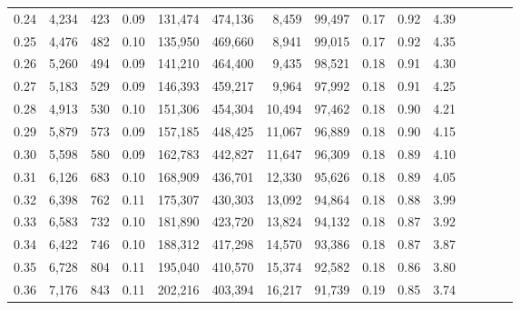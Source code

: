 \begin{tabular}{rrrcrrrrrrrrrrr}
0.24 &   4,234 &    423 &                                       0.09 &  131,474 &  474,136 &    8,459 &   99,497 &  0.17 &  0.92 &                         4.39 \\
0.25 &   4,476 &    482 &                                       0.10 &  135,950 &  469,660 &    8,941 &   99,015 &  0.17 &  0.92 &                         4.35 \\
0.26 &   5,260 &    494 &                                       0.09 &  141,210 &  464,400 &    9,435 &   98,521 &  0.18 &  0.91 &                         4.30 \\
0.27 &   5,183 &    529 &                                       0.09 &  146,393 &  459,217 &    9,964 &   97,992 &  0.18 &  0.91 &                         4.25 \\
0.28 &   4,913 &    530 &                                       0.10 &  151,306 &  454,304 &   10,494 &   97,462 &  0.18 &  0.90 &                         4.21 \\
0.29 &   5,879 &    573 &                                       0.09 &  157,185 &  448,425 &   11,067 &   96,889 &  0.18 &  0.90 &                         4.15 \\
0.30 &   5,598 &    580 &                                       0.09 &  162,783 &  442,827 &   11,647 &   96,309 &  0.18 &  0.89 &                         4.10 \\
0.31 &   6,126 &    683 &                                       0.10 &  168,909 &  436,701 &   12,330 &   95,626 &  0.18 &  0.89 &                         4.05 \\
0.32 &   6,398 &    762 &                                       0.11 &  175,307 &  430,303 &   13,092 &   94,864 &  0.18 &  0.88 &                         3.99 \\
0.33 &   6,583 &    732 &                                       0.10 &  181,890 &  423,720 &   13,824 &   94,132 &  0.18 &  0.87 &                         3.92 \\
0.34 &   6,422 &    746 &                                       0.10 &  188,312 &  417,298 &   14,570 &   93,386 &  0.18 &  0.87 &                         3.87 \\
0.35 &   6,728 &    804 &                                       0.11 &  195,040 &  410,570 &   15,374 &   92,582 &  0.18 &  0.86 &                         3.80 \\
0.36 &   7,176 &    843 &                                       0.11 &  202,216 &  403,394 &   16,217 &   91,739 &  0.19 &  0.85 &                         3.74 \\

\end{tabular}
